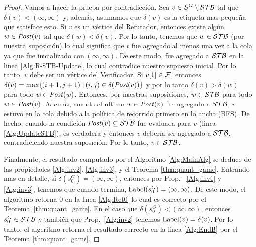\begin{proof}
Vamos a hacer la prueba por contradicción. Sea $v \in S^G \setminus \STB$ tal que $\delta(v) < (\infty, \infty)$ y, además, asumamos que
$\delta(v)$ es la etiqueta mas pequeña que satisface esto.
Si $v$ es un vértice del Refutador, entonces existe algún $w \in \post(v)$ tal que $\delta(w) < \delta(v)$. 
Por lo tanto, tenemos que $w \in \STB$ (por nuestra suposición) lo cual significa que $v$ fue agregado al menos una vez a la cola ya que fue inicializado con $(\infty, \infty)$. 
De este modo, fue agregado a $\STB$ en la linea \ref{Alg:R-STB-Update}, lo cual contradice nuestro supuesto inicial. 
Por lo tanto, $v$ debe ser un vértice del Verificador. 
Si $\pr{1}{v} \in \Faults$, entonces $\delta(v) = \max \{(i+1,j+1) \mid (i,j) \in \delta(\post(v))\}$ 
y por lo tanto $\delta(v) > \delta(w)$ para todo $w \in \post(w)$.
Entonces, por nuestras suposiciones, $w \in \STB$ para todo $w \in \post(v)$.
Además, cuando el ultimo $w \in \post(v)$ fue agregado a $\STB$, $v$ estuvo en la cola debido a la política de recorrido primero en lo ancho (BFS).
De hecho, cuando la condición $\post(v) \subseteq \STB$ fue evaluada para $v$ (linea \ref{Alg:UpdateSTB}), es verdadera y entonces $v$ 
debería ser agregado a $\STB$, contradiciendo nuestra suposición. Por lo tanto, $v \in \STB$.

Finalmente, el resultado computado por el Algoritmo \ref{Alg:MainAlg} se deduce de las propiedades \ref{Alg:inv2}, \ref{Alg:inv3}, 
y el Teorema \ref{thm:quant_game}. 
Entrando mas en detalle, si $\delta(s_{0}^G) = (\infty, \infty)$, entonces por Prop. ~\ref{Alg:inv0} y \ref{Alg:inv3}, tenemos que cuando termina, $\Label(s_{0}^G) = (\infty, \infty)$. 
De este modo, el algoritmo retorna $0$ en la linea \ref{Alg:Ret0} lo cual es correcto por el Teorema~\ref{thm:quant_game}. 
En el caso que $\delta(s_0^G)< (\infty, \infty)$, entonces $s_0^G \in \STB$ y también que Prop.~\ref{Alg:inv2} tenemos $\Label(v) = \delta(v)$. Por lo tanto, el algoritmo retorna el resultado correcto en la linea \ref{Alg:EndB} por el Teorema \ref{thm:quant_game}. 
\qedhere
\end{proof}
\fi




